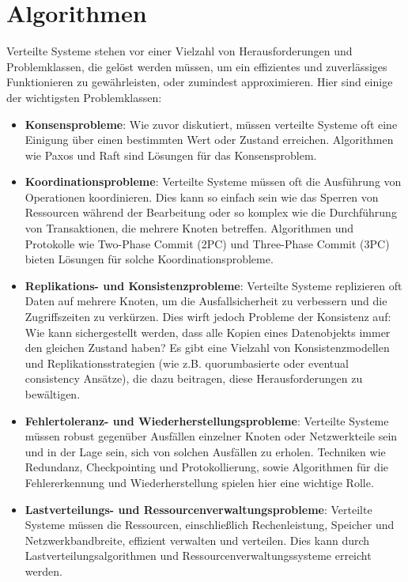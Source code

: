 \section{Algorithmen}

Verteilte Systeme stehen vor einer Vielzahl von Herausforderungen und Problemklassen, die gelöst werden müssen, um ein effizientes und zuverlässiges Funktionieren zu gewährleisten, oder zumindest approximieren. Hier sind einige der wichtigsten Problemklassen:
\begin{itemize}
\item \textbf{Konsensprobleme}: Wie zuvor diskutiert, müssen verteilte Systeme oft eine Einigung über einen bestimmten Wert oder Zustand erreichen. Algorithmen wie Paxos und Raft sind Lösungen für das Konsensproblem.

\item \textbf{Koordinationsprobleme}: Verteilte Systeme müssen oft die Ausführung von Operationen koordinieren. Dies kann so einfach sein wie das Sperren von Ressourcen während der Bearbeitung oder so komplex wie die Durchführung von Transaktionen, die mehrere Knoten betreffen. Algorithmen und Protokolle wie Two-Phase Commit (2PC) und Three-Phase Commit (3PC) bieten Lösungen für solche Koordinationsprobleme.

\item \textbf{Replikations- und Konsistenzprobleme}: Verteilte Systeme replizieren oft Daten auf mehrere Knoten, um die Ausfallsicherheit zu verbessern und die Zugriffszeiten zu verkürzen. Dies wirft jedoch Probleme der Konsistenz auf: Wie kann sichergestellt werden, dass alle Kopien eines Datenobjekts immer den gleichen Zustand haben? Es gibt eine Vielzahl von Konsistenzmodellen und Replikationsstrategien (wie z.B. quorumbasierte oder eventual consistency Ansätze), die dazu beitragen, diese Herausforderungen zu bewältigen.

\item \textbf{Fehlertoleranz- und Wiederherstellungsprobleme}: Verteilte Systeme müssen robust gegenüber Ausfällen einzelner Knoten oder Netzwerkteile sein und in der Lage sein, sich von solchen Ausfällen zu erholen. Techniken wie Redundanz, Checkpointing und Protokollierung, sowie Algorithmen für die Fehlererkennung und Wiederherstellung spielen hier eine wichtige Rolle.

\item \textbf{Lastverteilungs- und Ressourcenverwaltungsprobleme}: Verteilte Systeme müssen die Ressourcen, einschließlich Rechenleistung, Speicher und Netzwerkbandbreite, effizient verwalten und verteilen. Dies kann durch Lastverteilungsalgorithmen und Ressourcenverwaltungssysteme erreicht werden.
\end{itemize}

